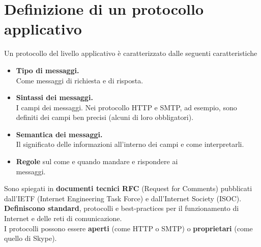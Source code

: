 \section{Definizione di un protocollo applicativo}
Un protocollo del livello applicativo è caratterizzato dalle seguenti caratteristiche
\begin{itemize}
    \item \textbf{Tipo di messaggi.}\\
    Come messaggi di richiesta e di risposta.
    \item \textbf{Sintassi dei messaggi.}\\
    I campi dei messaggi. Nei protocollo HTTP e SMTP, ad esempio, sono definiti dei campi ben precisi (alcuni di loro obbligatori).
    \item \textbf{Semantica dei messaggi.}\\
    Il significato delle informazioni all'interno dei campi e come interpretarli.
    \item \textbf{Regole} sul come e quando mandare e rispondere ai \\messaggi.
\end{itemize}
 Sono spiegati in \textbf{documenti tecnici RFC} (Request for Comments) pubblicati dall'IETF (Internet Engineering Task Force) e dall'Internet Society (ISOC). \textbf{Definiscono standard}, protocolli e best-practices per il funzionamento di Internet e delle reti di comunicazione.\\
 I protocolli possono essere \textbf{aperti} (come HTTP o SMTP) o \textbf{proprietari} (come quello di Skype).


\newpage

